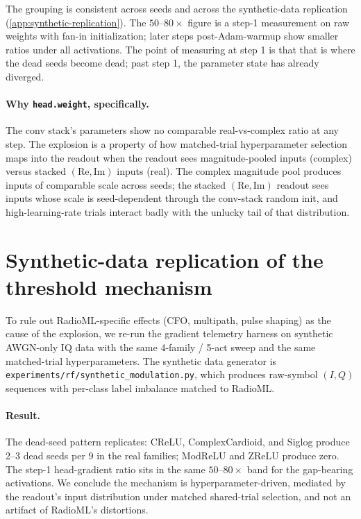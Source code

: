 \documentclass{article}
\providecommand{\Cref}[1]{\autoref{#1}}
\newcommand{\code}[1]{\texttt{#1}}
\begin{document}
The grouping is consistent across seeds and across the synthetic-data
replication (\Cref{app:synthetic-replication}). The
$50$--$80\times$ figure is a step-1 measurement on raw weights with
fan-in initialization; later steps post-Adam-warmup show smaller
ratios under all activations. The point of measuring at step 1 is that
that is where the dead seeds become dead; past step 1, the parameter
state has already diverged.

\paragraph{Why \code{head.weight}, specifically.} The conv stack's
parameters show no comparable real-vs-complex ratio at any step. The
explosion is a property of how matched-trial hyperparameter selection
maps into the readout when the readout sees magnitude-pooled inputs
(complex) versus stacked $(\mathrm{Re}, \mathrm{Im})$ inputs (real).
The complex magnitude pool produces inputs of comparable scale across
seeds; the stacked $(\mathrm{Re}, \mathrm{Im})$ readout sees inputs
whose scale is seed-dependent through the conv-stack random init, and
high-learning-rate trials interact badly with the unlucky tail of that
distribution.

\section{Synthetic-data replication of the threshold mechanism}
\label{app:synthetic-replication}

To rule out RadioML-specific effects (CFO, multipath, pulse shaping)
as the cause of the explosion, we re-run the gradient telemetry
harness on synthetic AWGN-only IQ data with the same 4-family / 5-act
sweep and the same matched-trial hyperparameters. The synthetic data
generator is \code{experiments/rf/synthetic\_modulation.py}, which
produces raw-symbol $(I, Q)$ sequences with per-class label imbalance
matched to RadioML.

\paragraph{Result.} The dead-seed pattern replicates: CReLU,
ComplexCardioid, and Siglog produce 2--3 dead seeds per 9 in the real
families; ModReLU and ZReLU produce zero. The step-1 head-gradient
ratio sits in the same $50$--$80\times$ band for the gap-bearing
activations. We conclude the mechanism is hyperparameter-driven,
mediated by the readout's input distribution under matched
shared-trial selection, and not an artifact of RadioML's distortions.
\end{document}
